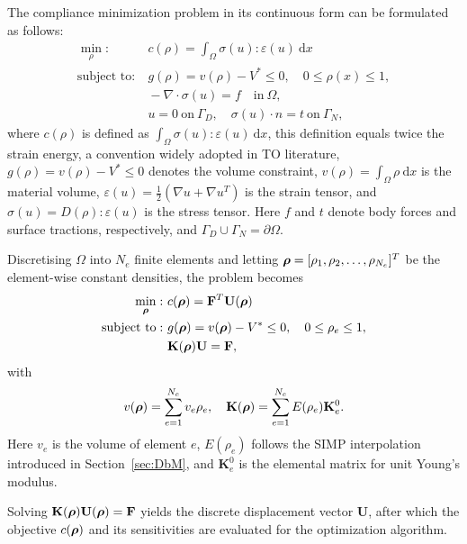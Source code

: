 \documentclass[mathpazo]{cicp}
\begin{document}
The compliance minimization problem in its continuous form can be formulated as follows:
\begin{equation}\label{eq:cmpc}
	\begin{aligned}
		\min_{\rho}:
		&~c(\rho) = \int_{\Omega}\sigma(u):\varepsilon(u)~\mathrm{d}x \\
		\text{subject~to}:
		&~g(\rho) = v(\rho) - V^*\leq0,\quad0\leq\rho(x)\leq1,\\
		&~-\nabla\cdot\sigma(u) = f\quad\text{in}~\Omega,\\
		&~u = 0~\text{on}~\Gamma_D,\quad\sigma(u)\cdot{n} = t~\text{on}~\Gamma_N,
	\end{aligned}
\end{equation}
where $c(\rho)$ is defined as $\int_{\Omega}\sigma(u):\varepsilon(u)~\mathrm{d}x$, this definition equals twice the strain energy, a convention widely adopted in TO literature, $g(\rho) = v(\rho) - V^*\leq0$ denotes the volume constraint, $v(\rho) = \int_{\Omega}\rho~\mathrm{d}x$ is the material volume, $\varepsilon(u) = \frac{1}{2}(\nabla{u}+\nabla{u}^T)$ is the strain tensor, and $\sigma(u) = D(\rho):\varepsilon(u)$ is the stress tensor. Here $f$ and $t$ denote body forces and surface tractions, respectively, and $\Gamma_D \cup \Gamma_N = \partial\Omega$.

Discretising $\Omega$ into $N_e$ finite elements and letting $\boldsymbol{\rho} = [\rho_1, \rho_2, \dots, \rho_{N_e}]^T$ be the element-wise constant densities, the problem becomes
\begin{equation}\label{eq:cmpd}
	\begin{aligned} 
		\min_{\boldsymbol{\rho}}:
		&~c(\boldsymbol{\rho}) = \mathbf{F}^T\mathbf{U}(\boldsymbol{\rho})\\ 
		\text{subject~to}:
		&~g(\boldsymbol{\rho}) = v(\boldsymbol{\rho})- V^*\leq0,\quad0\leq\rho_e\leq1,\\
		&~\mathbf{K}(\boldsymbol{\rho})\mathbf{U} = \mathbf{F},\\ 
	\end{aligned}
\end{equation}
with
\begin{equation*}
	v(\boldsymbol{\rho}) = \sum_{e=1}^{N_e} v_e\rho_e,\quad\mathbf{K}(\boldsymbol{\rho}) = \sum_{e=1}^{N_e}E(\rho_e)\mathbf{K}_e^0.
\end{equation*}
Here $v_e$ is the volume of element $e$, $E(\rho_e)$ follows the SIMP interpolation introduced in Section~\ref{sec:DbM}, and $\mathbf{K}_e^0$ is the elemental matrix for unit Young’s modulus.

Solving $\mathbf{K}(\boldsymbol{\rho})\mathbf{U}(\boldsymbol{\rho}) = \mathbf{F}$ yields the discrete displacement vector $\mathbf{U}$, after which the objective $c(\boldsymbol{\rho})$ and its sensitivities are evaluated for the optimization algorithm.
\end{document}
